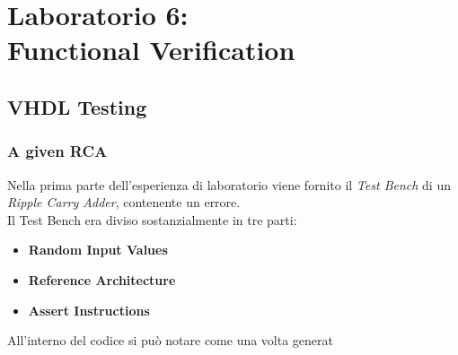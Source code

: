 \chapter{Laboratorio 6: \\Functional Verification}
\section{VHDL Testing}
\subsection{A given RCA}
Nella prima parte dell'esperienza di laboratorio viene fornito il \textit{Test Bench} di un \textit{Ripple Carry Adder}, contenente un errore.\\
Il Test Bench era diviso sostanzialmente in tre parti:
\begin{itemize}
	\item \textbf{Random Input Values}
	\item \textbf{Reference Architecture}
	\item \textbf{Assert Instructions}
\end{itemize}
All'interno del codice si può notare come una volta generat
